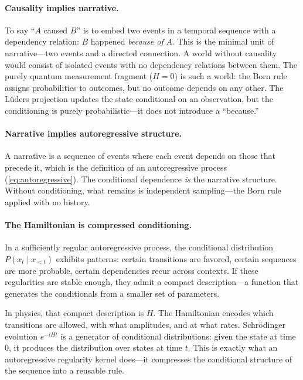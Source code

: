 \documentclass[12pt,a4paper]{article}
\theoremstyle{definition}
\theoremstyle{remark}
\begin{document}
\paragraph{Causality implies narrative.}

To say ``$A$ caused $B$'' is to embed two events in a temporal
sequence with a dependency relation: $B$ happened \emph{because of}
$A$.  This is the minimal unit of narrative---two events and a
directed connection.  A world without causality would consist of
isolated events with no dependency relations between them.
The purely quantum measurement fragment ($H = 0$) is
such a world: the Born rule assigns probabilities to outcomes, but
no outcome depends on any other.  The L\"uders projection updates
the state conditional on an observation, but the conditioning is
purely probabilistic---it does not introduce a ``because.''

\paragraph{Narrative implies autoregressive structure.}

A narrative is a sequence of events where each event depends on those
that precede it, which is the definition of an autoregressive process
(\cref{eq:autoregressive}).  The conditional dependence \emph{is}
the narrative structure.  Without conditioning, what remains is
independent sampling---the Born rule applied with no history.

\paragraph{The Hamiltonian is compressed conditioning.}

In a sufficiently regular autoregressive process, the conditional
distribution $P(x_t \mid x_{<t})$ exhibits patterns: certain
transitions are favored, certain sequences are more probable, certain
dependencies recur across contexts.  If these regularities are stable
enough, they admit a compact description---a function that generates
the conditionals from a smaller set of parameters.

In physics, that compact description is $H$.  The Hamiltonian
encodes which transitions are allowed, with what amplitudes, and at
what rates.  Schrödinger evolution $e^{-iHt}$ is a generator of
conditional distributions: given the state at time $0$, it produces
the distribution over states at time $t$.  This is exactly what an
autoregressive regularity kernel does---it compresses the conditional
structure of the sequence into a reusable rule.
\end{document}
